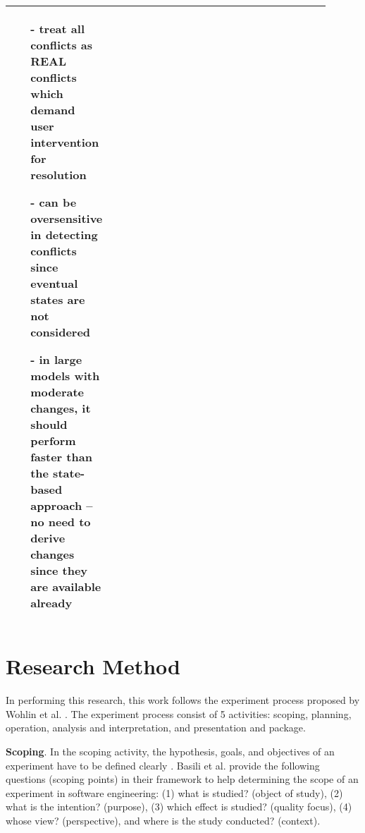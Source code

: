 \begin{table}[ht]
\begin{tabular}{|p{0.14\linewidth}|p{0.38\linewidth}|p{0.38\linewidth}|}
\begin{minipage}[t]{\linewidth}
      \raggedright
    \begin{itemize}[leftmargin=9pt]
      \setlength\itemsep{2pt}
      \item[-] treat all conflicts as \textsf{REAL} conflicts which demand user intervention for resolution
      \item[-] can be oversensitive in detecting conflicts since eventual states are not considered
      \item[-] in large models with moderate changes, it should perform faster than the state-based approach -- no need to derive changes since they are available already 
      \item[]
    \end{itemize} 
  \end{minipage}
    \\
    \hline                         
  \end{tabular}
\end{table}

\section{Research Method}
\label{sec:research_method}
In performing this research, this work follows the experiment process proposed by Wohlin et al. \cite{DBLP:books/daglib/0029933/Wohlin}. The experiment process consist of 5 activities: scoping, planning, operation, analysis and interpretation, and presentation and package.

\textbf{Scoping}. In the scoping activity, the hypothesis, goals, and objectives of an experiment have to be defined clearly \cite{DBLP:books/daglib/0029933/Wohlin}. Basili et al. \cite{basili1988tame} provide the following questions (scoping points) in their framework to help determining the scope of an experiment in software engineering: (1) what is studied? (object of study), (2) what is the intention? (purpose), (3) which effect is studied? (quality focus), (4) whose view? (perspective), and where is the study conducted? (context).


